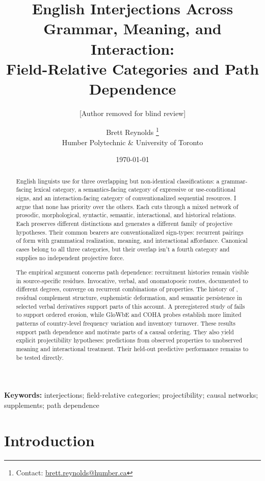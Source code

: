 \documentclass[12pt]{article}
\title{English Interjections Across Grammar, Meaning, and Interaction:\\
Field-Relative Categories and Path Dependence}
\author{[Author removed for blind review]}
\author{Brett Reynolds \orcidlink{0000-0003-0073-7195}%
\thanks{Contact: \href{mailto:brett.reynolds@humber.ca}{brett.reynolds@humber.ca}}\\
Humber Polytechnic \& University of Toronto}
\date{\today}
\begin{document}
\maketitle

\begin{abstract}
English linguists use  for three overlapping but
non-identical classifications: a grammar-facing lexical category, a
semantics-facing category of expressive or use-conditional signs, and an
interaction-facing category of conventionalized sequential resources. I
argue that none has priority over the others. Each cuts through a mixed
network of prosodic, morphological, syntactic, semantic, interactional, and
historical relations. Each preserves different distinctions and generates a
different family of projective hypotheses. Their common bearers are
conventionalized sign-types: recurrent pairings of form with grammatical
realization, meaning, and interactional affordance.
Canonical cases belong to all three categories, but their overlap isn't a
fourth category and supplies no independent projective force.

The empirical argument concerns path dependence: recruitment histories remain
visible in source-specific residues. Invocative, verbal, and onomatopoeic
routes, documented to different degrees, converge on recurrent combinations
of properties. The history of , residual
complement structure, euphemistic deformation, and semantic persistence in
selected verbal derivatives support parts of this account. A preregistered
study of  fails to support ordered erosion, while GloWbE and COHA
probes establish more limited patterns of country-level frequency variation
and inventory turnover. These results support path dependence and motivate
parts of a causal ordering. They also yield explicit projectibility
hypotheses: predictions from observed properties to unobserved meaning and
interactional treatment. Their
held-out predictive performance remains to be tested directly.
\end{abstract}

\noindent\textbf{Keywords:} interjections; field-relative categories; projectibility;
causal networks; supplements; path dependence


\section{Introduction}\label{sec:intro}
\end{document}
